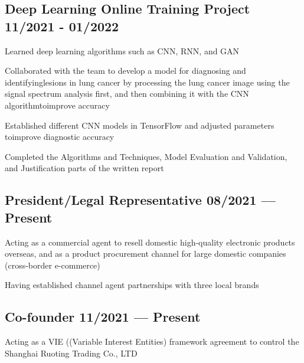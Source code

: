 \documentclass[letter,10pt]{article}
\begin{document}
\subsection{{Deep Learning Online Training Project \hfill 11/2021 - 01/2022}}
\begin{zitemize}
\item Learned deep learning algorithms such as CNN, RNN, and GAN
\item Collaborated with the team to develop a model for diagnosing and identifyinglesions in lung cancer by processing the lung cancer image using the signal spectrum analysis first, and then combining it with the CNN algorithmtoimprove accuracy
\item Established different CNN models in TensorFlow and adjusted parameters toimprove diagnostic accuracy
\item Completed the Algorithms and Techniques, Model Evaluation and Validation, and Justification parts of the written report
\end{zitemize}

\subsection{{President/Legal Representative \hfill 08/2021 –-- Present}}
\begin{zitemize}
\item Acting as a commercial agent to resell domestic high-quality electronic products overseas, and as a product procurement channel for large domestic companies (cross-border e-commerce)
\item Having established channel agent partnerships with three local brands
\end{zitemize}

\subsection{{Co-founder \hfill 11/2021 –-- Present}}
\begin{zitemize}
\item Acting as a VIE ((Variable Interest Entities) framework agreement to control the Shanghai Ruoting Trading Co., LTD
\end{zitemize}
\end{document}
